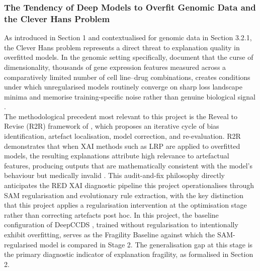 \subsubsection{The Tendency of Deep Models to Overfit Genomic Data and the Clever Hans Problem}
As introduced in Section 1 and contextualised for genomic data in Section 3.2.1, the Clever Hans problem 
represents a direct threat to explanation quality in overfitted models. In the genomic setting specifically, 
\cite{Partin2023} document that the curse of dimensionality, thousands of gene expression features measured 
across a comparatively limited number of cell line–drug combinations, creates conditions under which unregularised 
models routinely converge on sharp loss landscape minima and memorise training-specific noise rather than genuine 
biological signal \cite{Li2018}.
\\
The methodological precedent most relevant to this project is the Reveal to Revise (R2R) framework of \cite{Pahde2023}, which proposes an iterative cycle of bias identification, artefact localisation, model correction, 
and re-evaluation. R2R demonstrates that when XAI methods such as LRP are applied to overfitted models, the 
resulting explanations attribute high relevance to artefactual features, producing outputs that are mathematically 
consistent with the model's behaviour but medically invalid \cite{Pahde2023,Klauschen2024}. 
This audit-and-fix philosophy directly anticipates the RED XAI diagnostic pipeline this project operationalises 
through SAM regularisation and evolutionary rule extraction, with the key distinction that this project applies a 
regularisation intervention at the optimisation stage rather than correcting artefacts post hoc.
In this project, the baseline configuration of DeepCCDS \cite{Wu2025}, trained without regularisation to 
intentionally exhibit overfitting, serves as the Fragility Baseline against which the SAM-regularised model is 
compared in Stage 2. The generalisation gap at this stage is the primary diagnostic indicator of explanation fragility, 
as formalised in Section 2.
